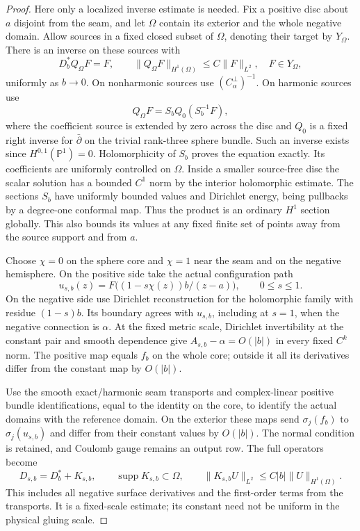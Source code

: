 \documentclass[11pt]{amsart}
\theoremstyle{definition}
\theoremstyle{remark}
\theoremstyle{plain}
\begin{document}
\begin{proof}
Here only a localized inverse estimate is needed.
Fix a positive disc about $a$ disjoint from the seam,
and let $\Omega$ contain its exterior and the whole
negative domain. Allow sources in a fixed closed
subset of $\Omega$, denoting their target by $Y_\Omega$.
There is an inverse on these sources with
\begin{equation}\label{eq:sphere-localized-source-inverse}
 D_b^*Q_\Omega F=F,\qquad
 \|Q_\Omega F\|_{H^1(\Omega)}\le C\|F\|_{L^2},
                                      \quad F\in Y_\Omega,
\end{equation}
uniformly as $b\to0$. On nonharmonic sources use
$(C_\alpha^\perp)^{-1}$. On harmonic sources use
\[
                     Q_\Omega F=S_bQ_0(S_b^{-1}F),
\]
where the coefficient source is extended by zero across
the disc and $Q_0$ is a fixed right inverse for
$\bar\partial$ on the trivial rank-three sphere bundle.
Such an inverse exists since $H^{0,1}(\mathbb P^1)=0$.
Holomorphicity of $S_b$ proves the equation exactly.
Its coefficients are uniformly controlled on $\Omega$.
Inside a smaller source-free disc the scalar solution
has a bounded $C^1$ norm by the interior holomorphic
estimate. The sections $S_b$ have uniformly bounded
values and Dirichlet energy, being pullbacks by a
degree-one conformal map. Thus the product is an
ordinary $H^1$ section globally. This also bounds
its values at any fixed finite set of points away
from the source support and from $a$.

Choose $\chi=0$ on the sphere core and $\chi=1$
near the seam and on the negative hemisphere.
On the positive side take the actual configuration path
\[
                   u_{s,b}(z)
              =F\bigl((1-s\chi(z))b/(z-a)\bigr),
                              \qquad 0\le s\le1.
\]
On the negative side use Dirichlet reconstruction
for the holomorphic family with residue $(1-s)b$.
Its boundary agrees with $u_{s,b}$, including at $s=1$,
when the negative connection is $\alpha$.
At the fixed metric scale, Dirichlet invertibility
at the constant pair and smooth dependence give
$A_{s,b}-\alpha=O(|b|)$ in every fixed $C^k$ norm.
The positive map equals $f_b$ on the whole core;
outside it all its derivatives differ from the
constant map by $O(|b|)$.

Use the smooth exact/harmonic seam transports and
complex-linear positive bundle identifications,
equal to the identity on the core, to identify
the actual domains with the reference domain.
On the exterior these maps send
$\sigma_j(f_b)$ to $\sigma_j(u_{s,b})$ and differ
from their constant values by $O(|b|)$.
The normal condition is retained, and Coulomb
gauge remains an output row. The full operators become
\begin{equation}\label{eq:interior-sphere-supported-perturbation}
 D_{s,b}=D_b^*+K_{s,b},\qquad
 \operatorname{supp}K_{s,b}\subset\Omega,\qquad
 \|K_{s,b}U\|_{L^2}\le C|b|\|U\|_{H^1(\Omega)}.
\end{equation}
This includes all negative surface derivatives and
the first-order terms from the transports. It is a
fixed-scale estimate; its constant need not be uniform
in the physical gluing scale.


\end{proof}
\end{document}
